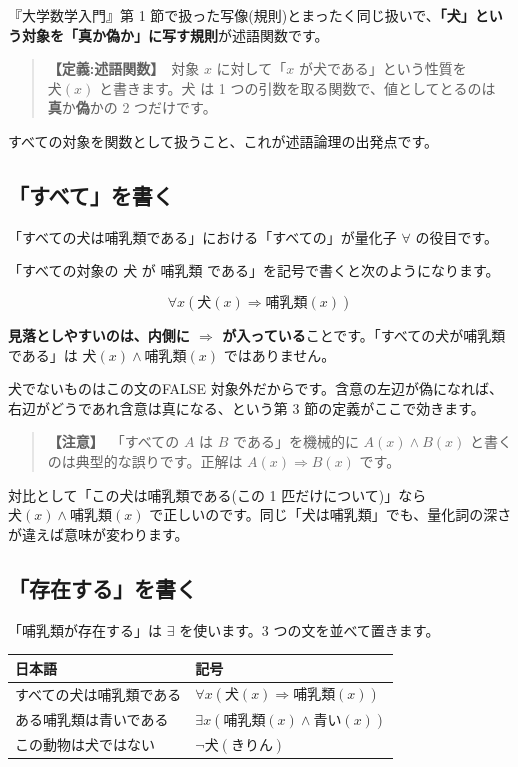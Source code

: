 \documentclass{article}
\begin{document}
『大学数学入門』第 1 節で扱った写像(規則)とまったく同じ扱いで、\textbf{「犬」という対象を「真か偽か」に写す規則}が述語関数です。

\begin{quote}
\textbf{【定義:述語関数】}\ 対象 \(x\) に対して「\(x\) が犬である」という性質を \(\mathrm{犬}(x)\) と書きます。\(\mathrm{犬}\) は 1 つの引数を取る関数で、値としてとるのは \textbf{真}か\textbf{偽}かの 2 つだけです。
\end{quote}

すべての対象を関数として扱うこと、これが述語論理の出発点です。

\subsection{「すべて」を書く}

「すべての犬は哺乳類である」における「すべての」が量化子 \(\forall\) の役目です。

「すべての対象の \(\mathrm{犬}\) が \(\mathrm{哺乳類}\) である」を記号で書くと次のようになります。

\[ \forall x \left( \mathrm{犬}(x) \Rightarrow \mathrm{哺乳類}(x) \right) \]

\textbf{見落としやすいのは、内側に \(\Rightarrow\) が入っている}ことです。「すべての犬が哺乳類である」は \(\mathrm{犬}(x) \land \mathrm{哺乳類}(x)\) ではありません。

犬でないものはこの文のFALSE 対象外だからです。含意の左辺が偽になれば、右辺がどうであれ含意は真になる、という第 3 節の定義がここで効きます。

\begin{quote}
\textbf{【注意】}\ 「すべての \(A\) は \(B\) である」を機械的に \(A(x) \land B(x)\) と書くのは典型的な誤りです。正解は \textbf{\(A(x) \Rightarrow B(x)\)} です。
\end{quote}

対比として「この犬は哺乳類である(この 1 匹だけについて)」なら \(\mathrm{犬}(x) \land \mathrm{哺乳類}(x)\) で正しいのです。同じ「犬は哺乳類」でも、量化詞の深さが違えば意味が変わります。

\subsection{「存在する」を書く}

「哺乳類が存在する」は \(\exists\) を使います。3 つの文を並べて置きます。

\begin{center}
\begin{tabular}{|l|l|}
\hline
日本語 & 記号 \\
\hline
すべての犬は哺乳類である & \(\forall x \left( \mathrm{犬}(x) \Rightarrow \mathrm{哺乳類}(x) \right)\) \\
ある哺乳類は青いである & \(\exists x \left( \mathrm{哺乳類}(x) \land \mathrm{青い}(x) \right)\) \\
この動物は犬ではない & \(\neg \mathrm{犬}(\mathrm{きりん})\) \\
\hline
\end{tabular}
\end{center}
\end{document}
